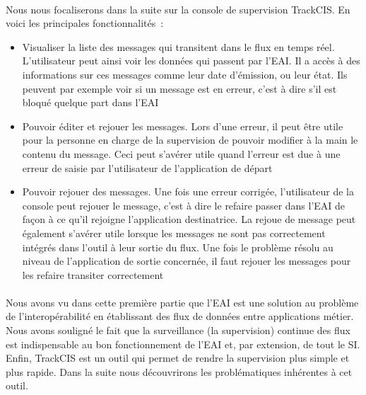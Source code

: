 			\paragraph{}%
			Nous nous focaliserons dans la suite sur la console de supervision TrackCIS.
			En voici les principales fonctionnalités~:
			\begin{itemize}
			  \item Visualiser la liste des messages qui transitent dans le flux en temps
			  réel. L'utilisateur peut ainsi voir les données qui passent par l'EAI. Il
			  a accès à des informations sur ces messages comme leur date d'émission, ou
			  leur état. Ils peuvent par exemple voir si un message est en erreur, c'est
			  à dire s'il est bloqué quelque part dans l'EAI
			  \item Pouvoir éditer et rejouer les messages. Lors d'une erreur, il peut
			  être utile pour la personne en charge de la supervision de pouvoir modifier
			  à la main le contenu du message. Ceci peut s'avérer utile quand l'erreur
			  est due à une erreur de saisie par l'utilisateur de l'application de
			  départ
			  \item Pouvoir rejouer des messages. Une fois une erreur corrigée,
			  l'utilisateur de la console peut rejouer le message, c'est à dire le refaire passer dans
			  l'EAI de façon à ce qu'il rejoigne l'application destinatrice. La rejoue de
			  message peut également s'avérer utile lorsque les messages ne sont pas
			  correctement intégrés dans l'outil à leur sortie du flux. Une fois le
			  problème résolu au niveau de l'application de sortie concernée, il faut
			  rejouer les messages pour les refaire transiter correctement
			\end{itemize}
		
		\paragraph{}%
		Nous avons vu dans cette première partie que l'EAI est une solution au
		problème de l'interopérabilité en établissant des flux de données entre
		applications métier. Nous avons souligné le fait que la surveillance (la
		supervision) continue des flux est indispensable au bon fonctionnement de
		l'EAI et, par extension, de tout le SI. Enfin, TrackCIS est un outil qui
		permet de rendre la supervision plus simple et plus rapide.\newline
		Dans la suite nous découvrirons les problématiques inhérentes à cet outil.
		
